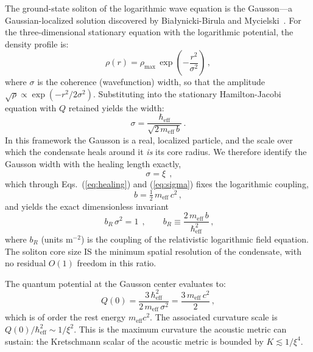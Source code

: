\documentclass[12pt, a4paper]{article}
\newcommand{\meff}{m_{\mathrm{eff}}}
\newcommand{\heff}{\hbar_{\mathrm{eff}}}
\begin{document}
The ground-state soliton of the logarithmic wave equation is the Gausson---a Gaussian-localized solution discovered by Bia{\l}ynicki-Birula and Mycielski~\cite{bialynicki_birula_1976, bialynicki_birula_1979}. For the three-dimensional stationary equation with the logarithmic potential, the density profile is:
\begin{equation}
    \rho(r) = \rho_{\max}\,
    \exp\!\left(-\frac{r^2}{\sigma^2}\right)\,,
\label{eq:gausson}
\end{equation}
where $\sigma$ is the coherence (wavefunction) width, so that the amplitude $\sqrt{\rho}\propto\exp(-r^2/2\sigma^2)$. Substituting into the stationary Hamilton-Jacobi equation with $Q$ retained yields the width:
\begin{equation}
    \sigma = \frac{\heff}{\sqrt{2\,\meff\,b}}\,.
\label{eq:sigma}
\end{equation}
In this framework the Gausson is a real, localized particle, and the scale over which the condensate heals around it \emph{is} its core radius. We therefore identify the Gausson width with the healing length exactly,
\begin{equation}
    \boxed{\;\sigma = \xi\;}\,,
\label{eq:sigma_xi}
\end{equation}
which through Eqs.~(\ref{eq:healing}) and (\ref{eq:sigma}) fixes the logarithmic coupling,
\begin{equation}
    b = \tfrac{1}{2}\,\meff\, c^2\,,
\label{eq:b_fixed}
\end{equation}
and yields the exact dimensionless invariant
\begin{equation}
    \boxed{\;b_R\,\sigma^2 = 1\;}\,,\qquad b_R \equiv \frac{2\,\meff\, b}{\heff^2}\,,
\label{eq:bR_sigma}
\end{equation}
where $b_R$ (units $\mathrm{m^{-2}}$) is the coupling of the relativistic logarithmic field equation. The soliton core size IS the minimum spatial resolution of the condensate, with no residual $O(1)$ freedom in this ratio.

The quantum potential at the Gausson center evaluates to:
\begin{equation}
    Q(0) = \frac{3\,\heff^2}{2\,\meff\,\sigma^2}
    = \frac{3\,\meff\,c^2}{2}\,,
\label{eq:Q_center}
\end{equation}
which is of order the rest energy $\meff c^2$. The associated curvature scale is $Q(0)/\heff^2 \sim 1/\xi^2$. This is the maximum curvature the acoustic metric can sustain: the Kretschmann scalar of the acoustic metric is bounded by $K \lesssim 1/\xi^4$.
\end{document}
